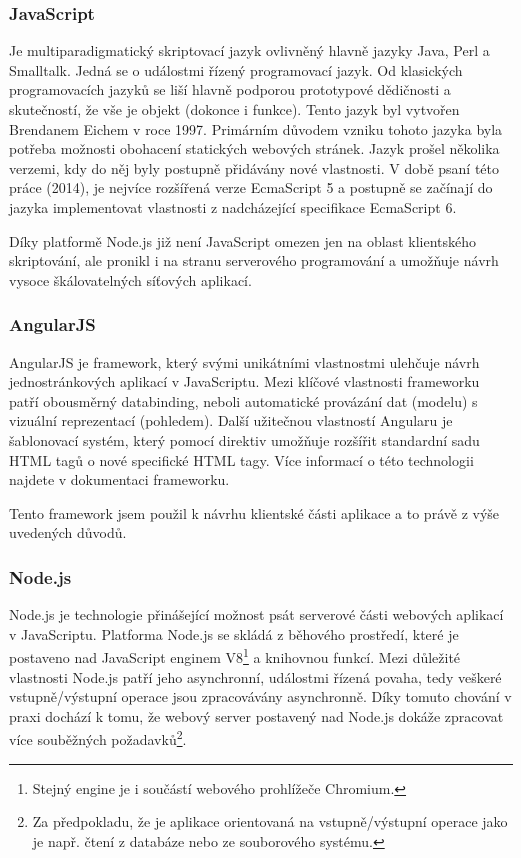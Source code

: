 \documentclass[ing,male,java,dept460]{diploma}						%
\begin{document}
\subsubsection{JavaScript}
\label{sec:JavaScript}
Je multiparadigmatický skriptovací jazyk ovlivněný hlavně jazyky Java, Perl a Smalltalk. Jedná se o událostmi řízený programovací jazyk. Od klasických programovacích jazyků se liší hlavně podporou prototypové dědičnosti a skutečností, že vše je objekt (dokonce i funkce). Tento jazyk byl vytvořen Brendanem Eichem v roce 1997. Primárním důvodem vzniku tohoto jazyka byla potřeba možnosti obohacení statických webových stránek. Jazyk prošel několika verzemi, kdy do něj byly postupně přidávány nové vlastnosti. V době psaní této práce (2014), je nejvíce rozšířená verze EcmaScript 5 a postupně se začínají do jazyka implementovat vlastnosti z nadcházející specifikace EcmaScript 6.

Díky platformě Node.js již není JavaScript omezen jen na oblast klientského skriptování, ale pronikl i na stranu serverového programování a umožňuje návrh vysoce škálovatelných síťových aplikací.

\subsubsection{AngularJS}
AngularJS je framework, který svými unikátními vlastnostmi ulehčuje návrh jednostránkových aplikací v JavaScriptu. Mezi klíčové vlastnosti frameworku patří obousměrný databinding, neboli automatické provázání dat (modelu) s vizuální reprezentací (pohledem). Další užitečnou vlastností Angularu je šablonovací systém, který pomocí direktiv umožňuje rozšířit standardní sadu HTML tagů o nové specifické HTML tagy. Více informací o této technologii najdete v dokumentaci frameworku\cite{angulardocs}.

Tento framework jsem použil k návrhu klientské části aplikace a to právě z výše uvedených důvodů.

\subsubsection{Node.js}
Node.js\cite{nodejs} je technologie přinášející možnost psát serverové části webových aplikací v JavaScriptu. Platforma Node.js se skládá z běhového prostředí, které je postaveno nad JavaScript enginem V8\footnote{Stejný engine je i součástí webového prohlížeče Chromium.} a knihovnou funkcí. Mezi důležité vlastnosti Node.js patří jeho asynchronní, událostmi řízená povaha, tedy veškeré vstupně/výstupní operace jsou zpracovávány asynchronně. Díky tomuto chování v praxi dochází k tomu, že webový server postavený nad Node.js dokáže zpracovat více souběžných požadavků\footnote{Za předpokladu, že je aplikace orientovaná na vstupně/výstupní operace jako je např. čtení z databáze nebo ze souborového systému.}.
\end{document}
